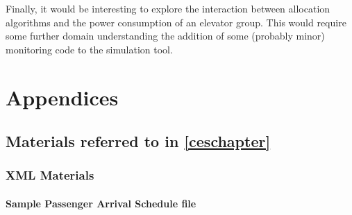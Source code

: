 \documentclass{UoYCSproject}
\begin{document}
Finally, it would be interesting to explore the interaction between allocation algorithms and the power consumption of an elevator group.  This would require some further domain understanding the addition  of some (probably minor) monitoring code to the simulation tool.



\appendix
\part{Appendices}

\chapter{Materials referred to in \autoref{ceschapter}}

\section{XML Materials}

\subsection{Sample Passenger Arrival Schedule file}
\end{document}
